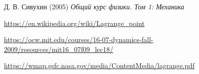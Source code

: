 \documentclass[12pt]{article}
\begin{document}
%
%
%
%
%
%
%
%
%
%
    \begin{thebibliography}{10}
        Д. В. Сивухин (2005) \emph{Общий курс физики. Том 1: Механика}
        
        \url{https://en.wikipedia.org/wiki/Lagrange_point}

        \url{https://ocw.mit.edu/courses/16-07-dynamics-fall-2009/resources/mit16_07f09_lec18/}

        \url{https://wmap.gsfc.nasa.gov/media/ContentMedia/lagrange.pdf}
    \end{thebibliography}
\end{document}
